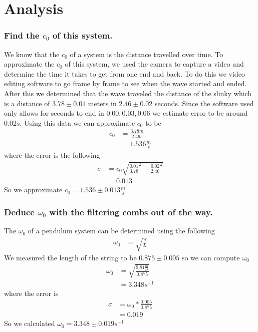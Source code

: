 \documentclass{article}
\begin{document}
\newpage
\section{Analysis}
\subsubsection*{Find the $c_0$ of this system.}
We know that the $c_0$ of a system is the distance travelled over time. To
approximate the $c_0$ of this system, we used the camera to capture a video
and determine the time it takes to get from one end and back. To do this we
video editing software to go frame by frame to see when the wave started and
ended. After this we determined that the wave traveled the distance of the
slinky which is a distance of $3.78 \pm 0.01$ meters in $2.46 \pm 0.02$ seconds.
Since the software used only allows for seconds to end in $0.00,0.03, 0.06$ we
estimate error to be around $0.02s$. Using this data we can approximate $c_0$
to be
\begin{align*}
    c_0 &= \frac{3.78m}{2.46s}\\
    &= 1.536 \frac{m}{s}
\end{align*}
where the error is the following
\begin{align*}
    \sigma &= c_0 \sqrt{\frac{0.01}{3.78}^2 + \frac{0.02}{2.46}^2}\\
    &= 0.013
\end{align*}
So we approximate $c_0 = 1.536 \pm 0.013 \frac{m}{s}$
\subsubsection*{Deduce $\omega_0$ with the filtering combs out of the way.}
The $\omega_0$ of a pendulum system can be determined using the following
\begin{align*}
    \omega_0 &= \sqrt{\frac{g}{L}}
\end{align*}
We measured the length of the string to be $0.875 \pm 0.005$ so we can compute
$\omega_0$
\begin{align*}
    \omega_0 &= \sqrt{\frac{9.81\frac{m}{s^2}}{0.875}}\\
    &= 3.348 s^{-1}
\end{align*}
where the error is 
\begin{align*}
    \sigma &= \omega_0 * \frac{0.005}{0.875}\\
    &= 0.019
\end{align*}
So we calculated $\omega_0 = 3.348 \pm 0.019 s^{-1}$ 
\end{document}
